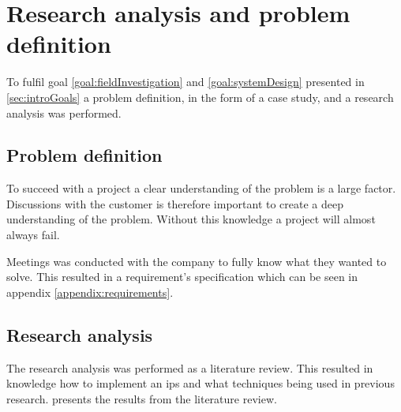 \section{Research analysis and problem definition}\label{sec:methodProblemDefinition}
To fulfil goal \ref{goal:fieldInvestigation} and \ref{goal:systemDesign} presented in \cref{sec:introGoals} a problem definition, in the form of a case study, and a research analysis was performed.

\subsection{Problem definition}\label{sec:methodProblemDefinition}
To succeed with a project a clear understanding of the problem is a large factor.
Discussions with the customer is therefore important to create a deep understanding of the problem.
Without this knowledge a project will almost always fail.
\cite{SecretsSuccessfulSimulation1995}

\bigskip

Meetings was conducted with the company to fully know what they wanted to solve.
This resulted in a requirement's specification which can be seen in appendix \ref{appendix:requirements}.

\subsection{Research analysis}\label{sec:methodResearchAnalysis}
The research analysis was performed as a literature review. 
This resulted in knowledge how to implement an \acrshort{ips} and what techniques being used in previous research.
 presents the results from the literature review.
